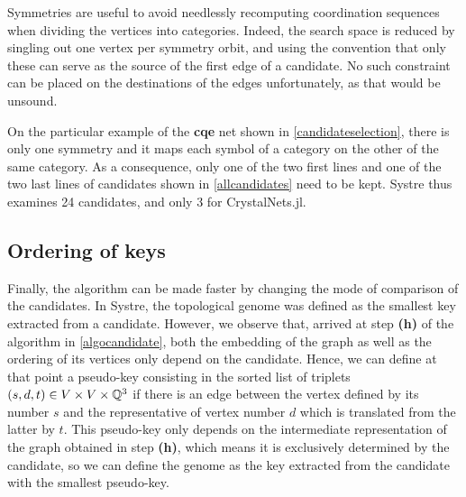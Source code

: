 \documentclass[main.tex]{subfiles}
\begin{document}
Symmetries are useful to avoid needlessly recomputing coordination sequences when dividing the vertices into categories. Indeed, the search space is reduced by singling out one vertex per symmetry orbit, and using the convention that only these can serve as the source of the first edge of a candidate. No such constraint can be placed on the destinations of the edges unfortunately, as that would be unsound.

On the particular example of the \textbf{cqe} net shown in \autoref{candidateselection}, there is only one symmetry and it maps each symbol of a category on the other of the same category. As a consequence, only one of the two first lines and one of the two last lines of candidates shown in \autoref{allcandidates} need to be kept. Systre thus examines 24 candidates, and only 3 for CrystalNets.jl.



\subsection{Ordering of keys}

Finally, the algorithm can be made faster by changing the mode of comparison of the candidates. In Systre, the topological genome was defined as the smallest key extracted from a candidate. However, we observe that, arrived at step {\bf (h)} of the algorithm in \autoref{algocandidate}, both the embedding of the graph as well as the ordering of its vertices only depend on the candidate. Hence, we can define at that point a pseudo-key consisting in the sorted list of triplets $(s, d, t)\in V\times V\times\mathbb{Q}^3$ if there is an edge between the vertex defined by its number $s$ and the representative of vertex number $d$ which is translated from the latter by $t$. This pseudo-key only depends on the intermediate representation of the graph obtained in step {\bf (h)}, which means it is exclusively determined by the candidate, so we can define the genome as the key extracted from the candidate with the smallest pseudo-key.
\end{document}
